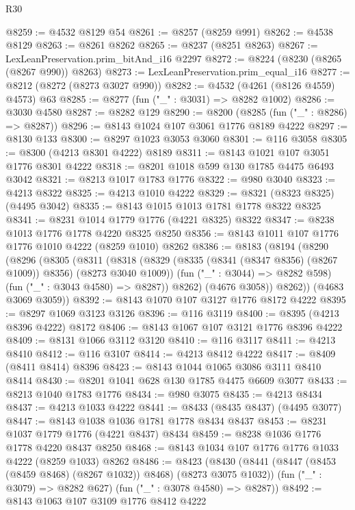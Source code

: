 \begin{lexlean}{R30}
\begin{coremodule}
@8259 := @4532 @8129 @54
@8261 := @8257 (@8259 @991)
@8262 := @4538 @8129
@8263 := @8261 @8262
@8265 := @8237 (@8251 @8263)
@8267 := LexLeanPreservation.prim_bitAnd_i16 @2297
@8272 := @8224 (@8230 (@8265 (@8267 @990)) @8263)
@8273 := LexLeanPreservation.prim_equal_i16
@8277 := @8212 (@8272 (@8273 @3027 @990))
@8282 := @4532 (@4261 (@8126 @4559) @4573) @63
@8285 := @8277 (fun ("_" : @3031) => @8282 @1002)
@8286 := @3030 @4580
@8287 := @8282 @129
@8290 := @8200 (@8285 (fun ("_" : @8286) => @8287))
@8296 := @8143 @1024 @107 @3061 @1776 @8189 @4222
@8297 := @8130 @133
@8300 := @8297 @1023 @3053 @3060
@8301 := @116 @3058
@8305 := @8300 (@4213 @8301 @4222) @8189
@8311 := @8143 @1021 @107 @3051 @1776 @8301 @4222
@8318 := @8201 @1018 @599 @130 @1785 @4475 @6493 @3042
@8321 := @8213 @1017 @1783 @1776
@8322 := @980 @3040
@8323 := @4213 @8322
@8325 := @4213 @1010 @4222
@8329 := @8321 (@8323 @8325) (@4495 @3042)
@8335 := @8143 @1015 @1013 @1781 @1778 @8322 @8325
@8341 := @8231 @1014 @1779 @1776 (@4221 @8325) @8322
@8347 := @8238 @1013 @1776 @1778 @4220 @8325 @8250
@8356 := @8143 @1011 @107 @1776 @1776 @1010 @4222 (@8259 @1010) @8262
@8386 := @8183
    (@8194
      (@8290
        (@8296
          (@8305
            (@8311
              (@8318
                (@8329 (@8335 (@8341 (@8347 @8356) (@8267 @1009)) @8356) (@8273 @3040 @1009))
                (fun ("_" : @3044) => @8282 @598)
                (fun ("_" : @3043 @4580) => @8287))
              @8262)
            (@4676 @3058))
          @8262))
      (@4683 @3069 @3059))
@8392 := @8143 @1070 @107 @3127 @1776 @8172 @4222
@8395 := @8297 @1069 @3123 @3126
@8396 := @116 @3119
@8400 := @8395 (@4213 @8396 @4222) @8172
@8406 := @8143 @1067 @107 @3121 @1776 @8396 @4222
@8409 := @8131 @1066 @3112 @3120
@8410 := @116 @3117
@8411 := @4213 @8410
@8412 := @116 @3107
@8414 := @4213 @8412 @4222
@8417 := @8409 (@8411 @8414) @8396
@8423 := @8143 @1044 @1065 @3086 @3111 @8410 @8414
@8430 := @8201 @1041 @628 @130 @1785 @4475 @6609 @3077
@8433 := @8213 @1040 @1783 @1776
@8434 := @980 @3075
@8435 := @4213 @8434
@8437 := @4213 @1033 @4222
@8441 := @8433 (@8435 @8437) (@4495 @3077)
@8447 := @8143 @1038 @1036 @1781 @1778 @8434 @8437
@8453 := @8231 @1037 @1779 @1776 (@4221 @8437) @8434
@8459 := @8238 @1036 @1776 @1778 @4220 @8437 @8250
@8468 := @8143 @1034 @107 @1776 @1776 @1033 @4222 (@8259 @1033) @8262
@8486 := @8423
    (@8430
      (@8441 (@8447 (@8453 (@8459 @8468) (@8267 @1032)) @8468) (@8273 @3075 @1032))
      (fun ("_" : @3079) => @8282 @627)
      (fun ("_" : @3078 @4580) => @8287))
@8492 := @8143 @1063 @107 @3109 @1776 @8412 @4222

\end{coremodule}
\end{lexlean}
